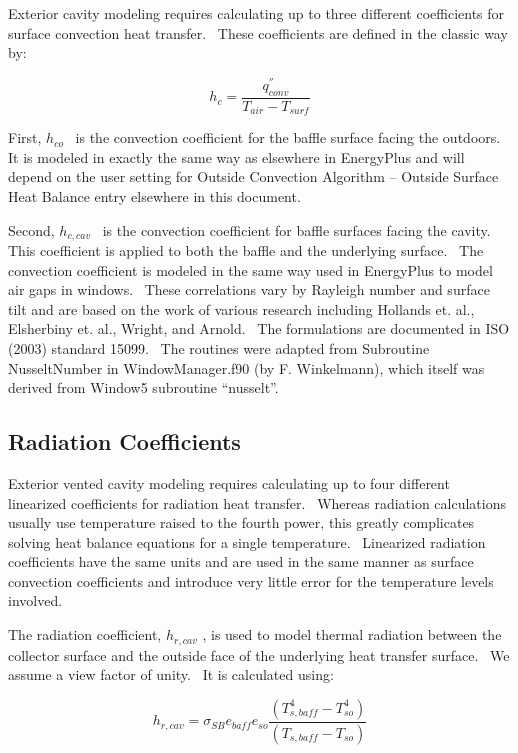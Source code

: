 Exterior cavity modeling requires calculating up to three different coefficients for surface convection heat transfer.~ These coefficients are defined in the classic way by:

\begin{equation}
{h_c} = \frac{q^{''}_{conv}}{T_{air} - T_{surf}}
\end{equation}

First, \({h_{co}}\) ~is the convection coefficient for the baffle surface facing the outdoors.~ It is modeled in exactly the same way as elsewhere in EnergyPlus and will depend on the user setting for Outside Convection Algorithm -- Outside Surface Heat Balance entry elsewhere in this document.

Second, \({h_{c,cav}}\) ~is the convection coefficient for baffle surfaces facing the cavity.~ This coefficient is applied to both the baffle and the underlying surface.~ The convection coefficient is modeled in the same way used in EnergyPlus to model air gaps in windows.~ These correlations vary by Rayleigh number and surface tilt and are based on the work of various research including Hollands et. al., Elsherbiny et. al., Wright, and Arnold.~ The formulations are documented in ISO (2003) standard 15099.~ The routines were adapted from Subroutine NusseltNumber in WindowManager.f90 (by F. Winkelmann), which itself was derived from Window5 subroutine ``nusselt''.

\subsection{Radiation Coefficients}\label{radiation-coefficients}

Exterior vented cavity modeling requires calculating up to four different linearized coefficients for radiation heat transfer.~ Whereas radiation calculations usually use temperature raised to the fourth power, this greatly complicates solving heat balance equations for a single temperature.~ Linearized radiation coefficients have the same units and are used in the same manner as surface convection coefficients and introduce very little error for the temperature levels involved.

The radiation coefficient, \({h_{r,cav}}\) , is used to model thermal radiation between the collector surface and the outside face of the underlying heat transfer surface.~ We assume a view factor of unity.~ It is calculated using:

\begin{equation}
{h_{r,cav}} = {\sigma_{SB}}{e_{baff}}{e_{so}}\frac{{\left( {T_{s,baff}^4 - T_{so}^4} \right)}}{{\left( {{T_{s,baff}} - {T_{so}}} \right)}}
\label{eq:HrcavEquation}
\end{equation}

